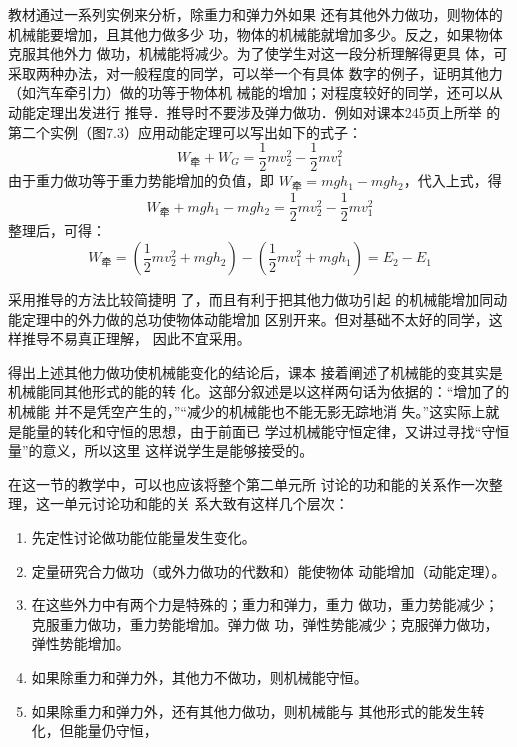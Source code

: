 教材通过一系列实例来分析，除重力和弹力外如果
还有其他外力做功，则物体的机械能要增加，且其他力做多少
功，物体的机械能就增加多少。反之，如果物体克服其他外力
做功，机械能将减少。为了使学生对这一段分析理解得更具
体，可采取两种办法，对一般程度的同学，可以举一个有具体
数字的例子，证明其他力（如汽车牵引力）做的功等于物体机
械能的增加；对程度较好的同学，还可以从动能定理出发进行
推导．推导时不要涉及弹力做功．例如对课本245页上所举
的第二个实例（图7.3）应用动能定理可以写出如下的式子：
\[W_{\text{牵}}+W_G=\frac{1}{2}mv^2_2-\frac{1}{2}mv^2_1\]
由于重力做功等于重力势能增加的负值，即
$W_{\text{牵}}=mgh_1-mgh_2$，代入上式，得
\[W_{\text{牵}}+mgh_1-mgh_2 =\frac{1}{2}mv^2_2-\frac{1}{2}mv^2_1 \]
整理后，可得：
\[W_{\text{牵}}=\left(\frac{1}{2}mv^2_2+mgh_2\right)-\left(\frac{1}{2}mv^2_1+mgh_1\right)=E_2-E_1\]
\begin{figure}[htp]
    \centering
{}
    
    \caption{}
\end{figure}


采用推导的方法比较简捷明
了，而且有利于把其他力做功引起
的机械能增加同动能定理中的外力做的总功使物体动能增加
区别开来。但对基础不太好的同学，这样推导不易真正理解，
因此不宜采用。

得出上述其他力做功使机械能变化的结论后，课本
接着阐述了机械能的变其实是机械能同其他形式的能的转
化。这部分叙述是以这样两句话为依据的：“增加了的机械能
并不是凭空产生的，”“减少的机械能也不能无影无踪地消
失。”这实际上就是能量的转化和守恒的思想，由于前面已
学过机械能守恒定律，又讲过寻找“守恒量”的意义，所以这里
这样说学生是能够接受的。

在这一节的教学中，可以也应该将整个第二单元所
讨论的功和能的关系作一次整理，这一单元讨论功和能的关
系大致有这样几个层次：

\begin{enumerate}
    \item 先定性讨论做功能位能量发生变化。
    \item 定量研究合力做功（或外力做功的代数和）能使物体
    动能增加（动能定理）。
    \item 在这些外力中有两个力是特殊的；重力和弹力，重力
    做功，重力势能减少；克服重力做功，重力势能增加。弹力做
    功，弹性势能减少；克服弹力做功，弹性势能增加。
    \item 如果除重力和弹力外，其他力不做功，则机械能守恒。
    \item 如果除重力和弹力外，还有其他力做功，则机械能与
    其他形式的能发生转化，但能量仍守恒，
\end{enumerate}

